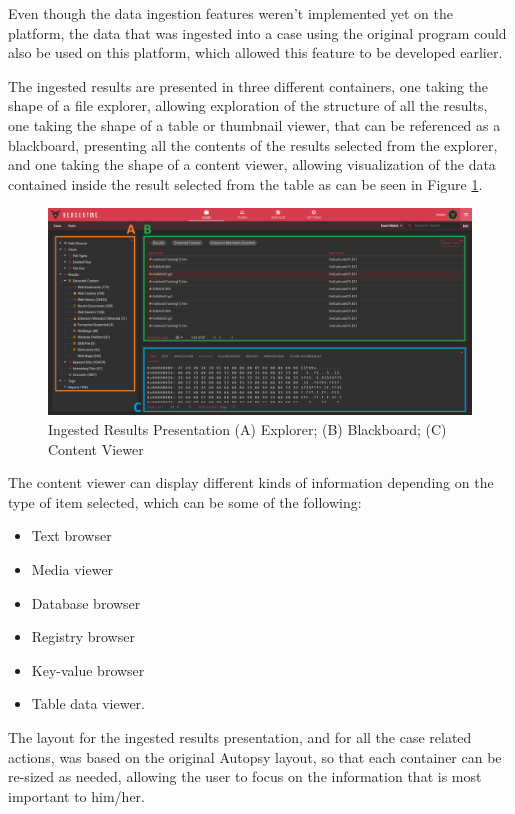 Even though the data ingestion features weren't implemented yet on the platform, the data that was ingested into a case using the original program could also be used on this platform, which allowed this feature to be developed earlier.

The ingested results are presented in three different containers, one taking the shape of a file explorer, allowing exploration of the structure of all the results, 
one taking the shape of a table or thumbnail viewer, that can be referenced as a blackboard, presenting all the contents of the results selected from the explorer, and one taking the shape of a content viewer, allowing visualization
of the data contained inside the result selected from the table as can be seen in Figure \ref{fig:data}.

\begin{figure}[ht]
 \centering
 \includegraphics[width=1\linewidth]{imgs/data.png}
 \caption{Ingested Results Presentation (A) Explorer; (B) Blackboard; (C) Content Viewer}
 \label{fig:data}
\end{figure}

The content viewer can display different kinds of information depending on the type of item selected, which can be some of the following:
\begin{itemize}
 \item Text browser
 \item Media viewer
 \item Database browser
 \item Registry browser
 \item Key-value browser
 \item Table data viewer.
\end{itemize}

The layout for the ingested results presentation, and for all the case related actions, was based on the original Autopsy layout, so that each container can be re-sized as
needed, allowing the user to focus on the information that is most important to him/her.

